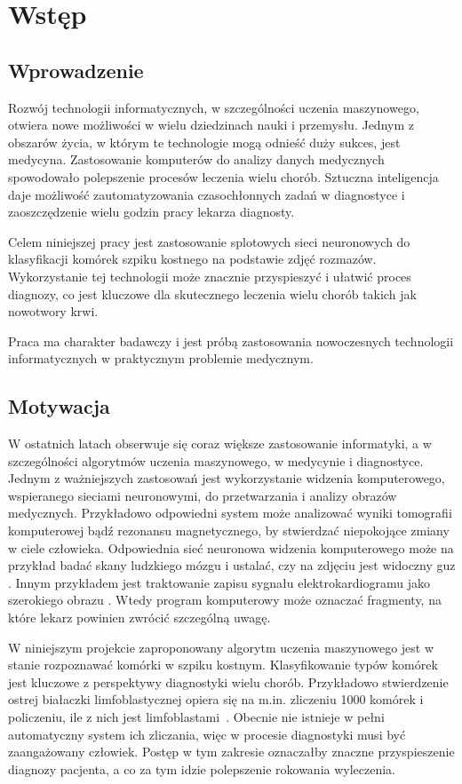 \chapter{Wstęp}


\section{Wprowadzenie}

Rozwój technologii informatycznych, w szczególności uczenia maszynowego, otwiera nowe możliwości w wielu dziedzinach nauki i przemysłu.
Jednym z obszarów życia, w którym te technologie mogą odnieść duży sukces, jest medycyna.
Zastosowanie komputerów do analizy danych medycznych spowodowało polepszenie procesów leczenia wielu chorób.
Sztuczna inteligencja daje możliwość zautomatyzowania czasochłonnych zadań w diagnostyce i zaoszczędzenie wielu godzin pracy lekarza diagnosty.

Celem niniejszej pracy jest zastosowanie splotowych sieci neuronowych do klasyfikacji komórek szpiku kostnego na podstawie zdjęć rozmazów.
Wykorzystanie tej technologii może znacznie przyspieszyć i ułatwić proces diagnozy, co jest kluczowe dla skutecznego leczenia wielu chorób takich jak nowotwory krwi.

Praca ma charakter badawczy i jest próbą zastosowania nowoczesnych technologii informatycznych w praktycznym problemie medycznym.


\section{Motywacja}

W ostatnich latach obserwuje się coraz większe zastosowanie informatyki, a w szczególności algorytmów uczenia maszynowego,
w medycynie i diagnostyce.
Jednym z ważniejszych zastosowań jest wykorzystanie widzenia komputerowego, wspieranego sieciami neuronowymi, do przetwarzania i analizy obrazów medycznych.
Przykładowo odpowiedni system może analizować wyniki tomografii komputerowej bądź rezonansu magnetycznego, by stwierdzać niepokojące zmiany w ciele człowieka.
Odpowiednia sieć neuronowa widzenia komputerowego może na przykład badać skany ludzkiego mózgu i ustalać, czy na zdjęciu jest widoczny guz \cite{brain_tumor}.
Innym przykładem jest traktowanie zapisu sygnału elektrokardiogramu jako szerokiego
obrazu \cite{ecg_cnn}.
Wtedy program komputerowy może oznaczać fragmenty, na które lekarz powinien zwrócić szczególną uwagę.

W niniejszym projekcie zaproponowany algorytm uczenia maszynowego jest w stanie rozpoznawać komórki w szpiku kostnym.
Klasyfikowanie typów komórek jest kluczowe z perspektywy diagnostyki wielu chorób.
Przykładowo stwierdzenie ostrej białaczki limfoblastycznej opiera się na m.in.
zliczeniu 1000 komórek i policzeniu, ile z nich jest limfoblastami~\cite{blast_counting_diagnosis}.
Obecnie nie istnieje w pełni automatyczny system ich zliczania, więc w procesie diagnostyki musi być zaangażowany człowiek.
Postęp w tym zakresie oznaczałby znaczne przyspieszenie diagnozy pacjenta, a co za tym idzie polepszenie rokowania wyleczenia.


